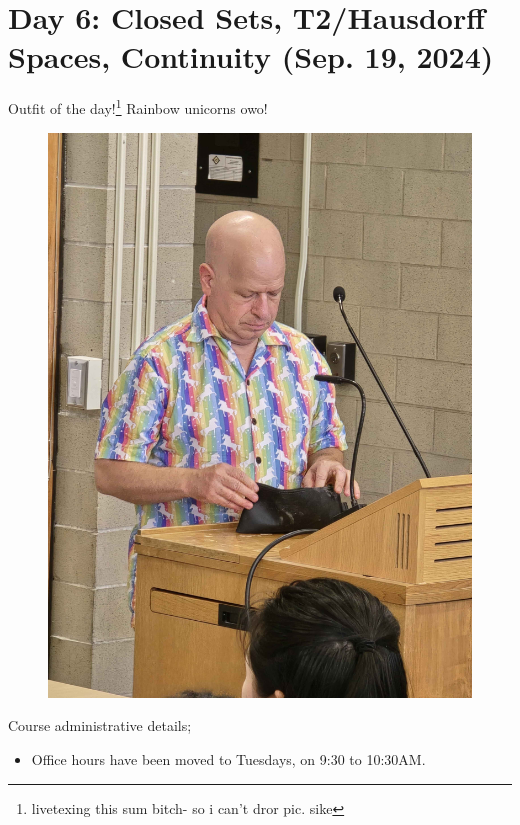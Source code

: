 \section{Day 6: Closed Sets, T2/Hausdorff Spaces, Continuity (Sep. 19, 2024)}
Outfit of the day!\footnote{livetexing this sum bitch- so i can't dror pic. sike} Rainbow unicorns owo!
\begin{figure}[h]
    \centering
    \includegraphics[scale=0.1]{MAT327 Notes/Dror Shirts/dror day 6 shirt.jpg}
\end{figure}

\noindent Course administrative details;
\begin{itemize}
    \item Office hours have been moved to Tuesdays, on 9:30 to 10:30AM.
\end{itemize}

